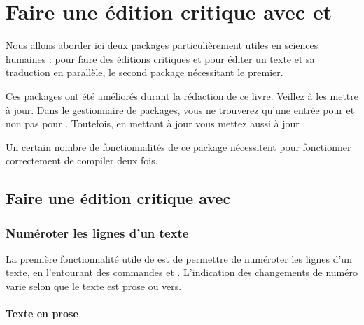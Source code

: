 \chapter{Faire une édition critique avec  et }  \label{ledmac}


\begin{prealable}
Nous allons aborder ici deux packages particulièrement utiles en sciences humaines :  pour faire des éditions critiques et  pour éditer un texte et sa traduction en parallèle, le second package nécessitant le premier.
\end{prealable}

\begin{attention}
Ces packages ont été améliorés durant la rédaction de ce livre. Veillez à les mettre à jour.
Dans le gestionnaire de packages, vous ne trouverez qu'une entrée pour   et non pas pour .  Toutefois, en mettant à jour  vous mettez aussi à jour  .
\end{attention}

\begin{attention}
Un certain nombre de fonctionnalités de ce package nécessitent pour fonctionner correctement de compiler deux fois.
\end{attention}



\section{Faire une édition critique avec }

\subsection{Numéroter les lignes d'un texte}

La première fonctionnalité utile de  est  de permettre  de numéroter les lignes d'un texte, en l'entourant des commandes  et . L'indication des changements de numéro varie selon que le texte est prose ou vers.

\subsubsection{Texte en prose}



